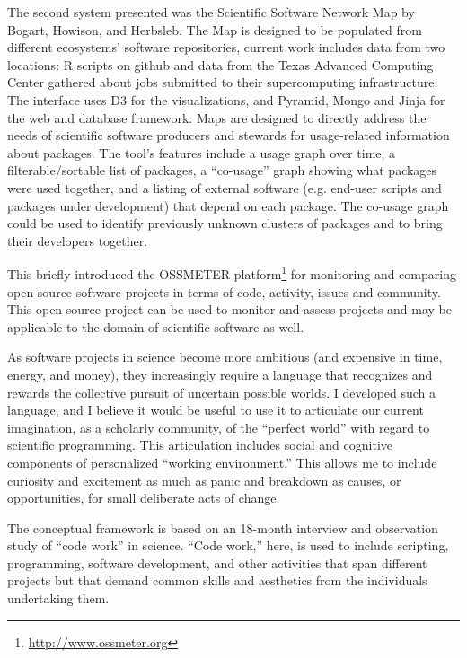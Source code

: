 \documentclass[a4paper,UKenglish]{dagrep}
\begin{document}
The second system presented was the Scientific Software Network Map by Bogart, Howison, and Herbsleb. The Map is designed to be populated from different ecosystems' software repositories, current work includes data from two locations: R scripts on github and data from the Texas Advanced Computing Center gathered about jobs submitted to their supercomputing infrastructure.  The interface uses D3 for the visualizations, and Pyramid, Mongo and Jinja for the web and database framework. Maps are designed to directly address the needs of scientific software producers and stewards for usage-related information about packages. The tool's features include a usage graph over time, a filterable/sortable list of packages, a ``co-usage'' graph showing what packages were used together, and a listing of external software (e.g. end-user scripts and packages under development) that depend on each package. The co-usage graph could be used to identify previously unknown clusters of packages and to bring their developers together.


This briefly introduced the OSSMETER platform\footnote{\url{http://www.ossmeter.org}} for monitoring and comparing open-source software projects in terms of code, activity, issues and community. This open-source project can be used to monitor and assess projects and may be applicable to the domain of scientific software as well.


As software projects in science become more ambitious (and expensive in time, energy, and money), they increasingly require a language that recognizes and rewards the collective pursuit of uncertain possible worlds. I developed such a language, and I believe it would be useful to use it to articulate our current imagination, as a scholarly community, of the ``perfect world'' with regard to scientific programming. This articulation includes social and cognitive components of personalized ``working environment.'' This allows me to include curiosity and excitement as much as panic and breakdown as causes, or opportunities, for small deliberate acts of change.

The conceptual framework is based on an 18-month interview and observation study of ``code work'' in science. ``Code work,'' here, is used to include scripting, programming, software development, and other activities that span different projects but that demand common skills and aesthetics from the individuals undertaking them.
\end{document}
